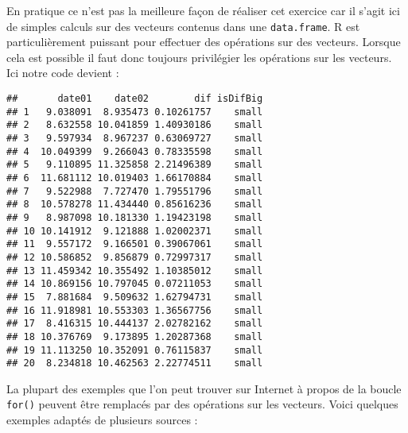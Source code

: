 \documentclass[]{book}
\newenvironment{Shaded}{\begin{snugshade}}{\end{snugshade}}
\newcommand{\KeywordTok}[1]{\textcolor[rgb]{0.13,0.29,0.53}{\textbf{#1}}}
\newcommand{\DataTypeTok}[1]{\textcolor[rgb]{0.13,0.29,0.53}{#1}}
\newcommand{\DecValTok}[1]{\textcolor[rgb]{0.00,0.00,0.81}{#1}}
\newcommand{\StringTok}[1]{\textcolor[rgb]{0.31,0.60,0.02}{#1}}
\newcommand{\OperatorTok}[1]{\textcolor[rgb]{0.81,0.36,0.00}{\textbf{#1}}}
\newcommand{\NormalTok}[1]{#1}
\theoremstyle{definition}
\theoremstyle{definition}
\theoremstyle{definition}
\theoremstyle{remark}
\begin{document}
En pratique ce n'est pas la meilleure façon de réaliser cet exercice car
il s'agit ici de simples calculs sur des vecteurs contenus dans une
\texttt{data.frame}. R est particulièrement puissant pour effectuer des
opérations sur des vecteurs. Lorsque cela est possible il faut donc
toujours privilégier les opérations sur les vecteurs. Ici notre code
devient :

\begin{Shaded}
\end{Shaded}

\begin{verbatim}
##       date01    date02        dif isDifBig
## 1   9.038091  8.935473 0.10261757    small
## 2   8.632558 10.041859 1.40930186    small
## 3   9.597934  8.967237 0.63069727    small
## 4  10.049399  9.266043 0.78335598    small
## 5   9.110895 11.325858 2.21496389    small
## 6  11.681112 10.019403 1.66170884    small
## 7   9.522988  7.727470 1.79551796    small
## 8  10.578278 11.434440 0.85616236    small
## 9   8.987098 10.181330 1.19423198    small
## 10 10.141912  9.121888 1.02002371    small
## 11  9.557172  9.166501 0.39067061    small
## 12 10.586852  9.856879 0.72997317    small
## 13 11.459342 10.355492 1.10385012    small
## 14 10.869156 10.797045 0.07211053    small
## 15  7.881684  9.509632 1.62794731    small
## 16 11.918981 10.553303 1.36567756    small
## 17  8.416315 10.444137 2.02782162    small
## 18 10.376769  9.173895 1.20287368    small
## 19 11.113250 10.352091 0.76115837    small
## 20  8.234818 10.462563 2.22774511    small
\end{verbatim}

La plupart des exemples que l'on peut trouver sur Internet à propos de
la boucle \texttt{for()} peuvent être remplacés par des opérations sur
les vecteurs. Voici quelques exemples adaptés de plusieurs sources :
\end{document}
